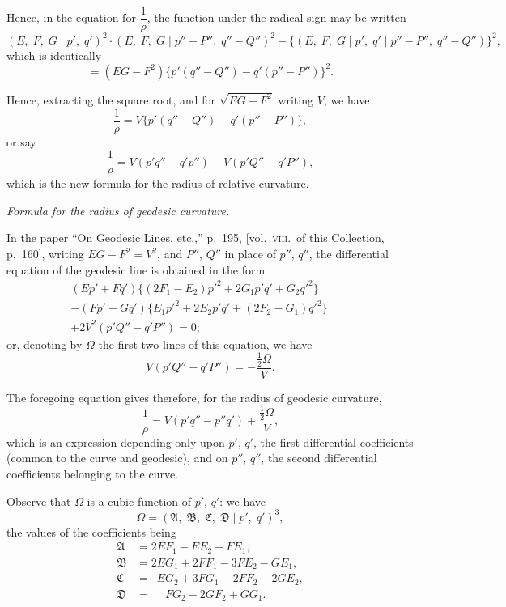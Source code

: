 \documentclass[11pt,a4paper]{book}
\begin{document}
Hence, in the equation for $\dfrac{1}{\rho}$, the function under the radical sign may be written
\[
(E,\; F,\; G \mid p',\; q')^2 \cdot (E,\; F,\; G \mid p'' - P'',\; q'' - Q'')^2 - \{(E,\; F,\; G \mid p',\; q' \mid p'' - P'',\; q'' - Q'')\}^2,
\]
which is identically
\[
= (EG - F^2)\{p'(q'' - Q'') - q'(p'' - P'')\}^2.
\]

Hence, extracting the square root, and for $\sqrt{EG - F^2}$ writing $V$, we have
\[
\frac{1}{\rho} = V\{p'(q'' - Q'') - q'(p'' - P'')\},
\]
or say
\[
\frac{1}{\rho} = V(p'q'' - q'p'') - V(p'Q'' - q'P''),
\]
which is the new formula for the radius of relative curvature.

\begin{center}
\textit{Formula for the radius of geodesic curvature.}
\end{center}

In the paper ``On Geodesic Lines, etc.,'' p.\ 195, [vol.\ \textsc{viii}.\ of this Collection, p.\ 160], writing $EG - F^2 = V^2$, and $P''$, $Q''$ in place of $p''$, $q''$, the differential equation of the geodesic line is obtained in the form
\begin{align*}
(Ep' + Fq')\{(2F_1 - E_2)p'^2 + 2G_1 p'q' + G_2 q'^2\} \quad\quad \\
- (Fp' + Gq')\{E_1 p'^2 + 2E_2 p'q' + (2F_2 - G_1)q'^2\} \quad\quad \\
+ 2V^2(p'Q'' - q'P'') = 0;
\end{align*}
or, denoting by $\Omega$ the first two lines of this equation, we have
\[
V(p'Q'' - q'P'') = -\frac{\tfrac{1}{2}\Omega}{V}.
\]

The foregoing equation gives therefore, for the radius of geodesic curvature,
\[
\frac{1}{\rho} = V(p'q'' - p''q') + \frac{\tfrac{1}{2}\Omega}{V},
\]
which is an expression depending only upon $p'$, $q'$, the first differential coefficients (common to the curve and geodesic), and on $p''$, $q''$, the second differential coefficients belonging to the curve.

Observe that $\Omega$ is a cubic function of $p'$, $q'$: we have
\[
\Omega = (\mathfrak{A},\; \mathfrak{B},\; \mathfrak{C},\; \mathfrak{D} \mid p',\; q')^3,
\]
the values of the coefficients being
\begin{align*}
\mathfrak{A} &= 2EF_1 - EE_2 - FE_1, \\
\mathfrak{B} &= 2EG_1 + 2FF_1 - 3FE_2 - GE_1, \\
\mathfrak{C} &= \phantom{2}EG_2 + 3FG_1 - 2FF_2 - 2GE_2, \\
\mathfrak{D} &= \phantom{2E}FG_2 - 2GF_2 + GG_1.
\end{align*}
\clearpage
\end{document}

